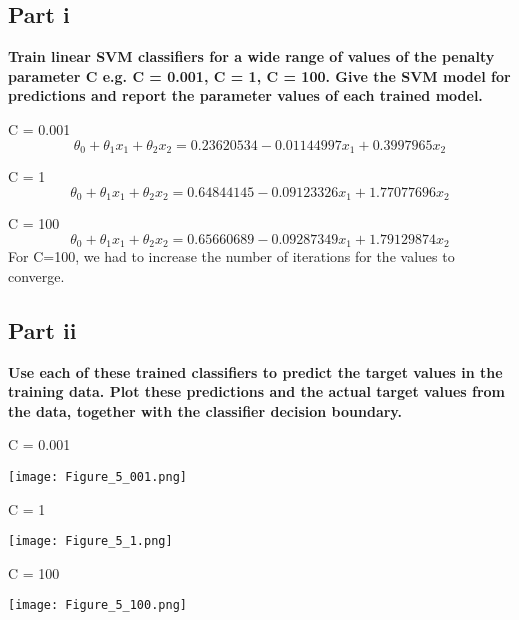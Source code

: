 \documentclass[10pt]{article}
\begin{document}
\subsection*{Part i}
\textbf{Train linear SVM classifiers for a wide range of values of the penalty parameter
C e.g. C = 0.001, C = 1, C = 100. Give the SVM model for predictions and
report the parameter values of each trained model.}
\vspace{5mm}

\vspace{1mm}

C = 0.001
\begin{equation*}
  \theta_{0} + \theta_{1}x_{1} + \theta_{2}x_{2} = 0.23620534 - 0.01144997x_{1} + 0.3997965x_{2}
\end{equation*}


C = 1
\begin{equation*}
  \theta_{0} + \theta_{1}x_{1} + \theta_{2}x_{2} = 0.64844145 - 0.09123326x_{1} + 1.77077696x_{2}
\end{equation*}
\vspace{1mm}

C = 100
\begin{equation*}
  \theta_{0} + \theta_{1}x_{1} + \theta_{2}x_{2} = 0.65660689 - 0.09287349x_{1} + 1.79129874x_{2}
\end{equation*}
\vspace{1mm}
For C=100, we had to increase the number of iterations for the values to converge.

\subsection*{Part ii}
\textbf{Use each of these trained classifiers to predict the target values in the training
data. Plot these predictions and the actual target values from the data, together
with the classifier decision boundary.}
\vspace{5mm}

C = 0.001
\begin{center}
  \texttt{[image: Figure\_5\_001.png]}
\end{center}
\vspace{5mm}

C = 1
\begin{center}
  \texttt{[image: Figure\_5\_1.png]}
\end{center}
\vspace{5mm}

C = 100
\begin{center}
  \texttt{[image: Figure\_5\_100.png]}
\end{center}
\vspace{5mm}
\end{document}
